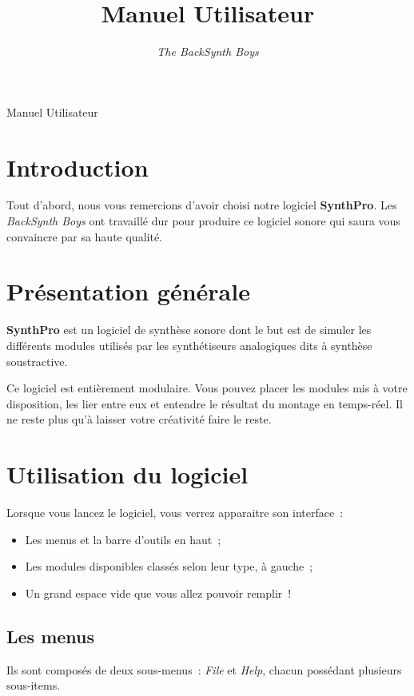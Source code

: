 \documentclass[a4paper,oneside,frenchb,10pt]{article}
\title{Manuel Utilisateur}
\author{\emph{The BackSynth Boys}}
\begin{document}
\thispagestyle{empty}

\begin{center}
\huge Manuel Utilisateur
\end{center}

\vspace{1cm}

\tableofcontents

\section{Introduction}

Tout d'abord, nous vous remercions d'avoir choisi notre logiciel
\textbf{SynthPro}. Les \emph{BackSynth Boys} ont travaillé dur pour produire ce logiciel
sonore qui saura vous convaincre par sa haute qualité.

\section{Présentation générale}

\textbf{SynthPro} est un logiciel de synthèse sonore dont le but est de 
simuler les différents modules utilisés par les synthétiseurs analogiques
dits à synthèse soustractive.

Ce logiciel est entièrement modulaire. Vous pouvez placer les modules
mis à votre disposition, les lier entre eux et entendre le résultat du
montage en temps-réel. Il ne reste plus qu'à laisser votre créativité
faire le reste.

\section{Utilisation du logiciel}

Lorsque vous lancez le logiciel, vous verrez apparaitre son interface~:

\begin{itemize}
\item
  Les menus et la barre d'outils en haut~;
\item
  Les modules disponibles classés selon leur type, à gauche~;
\item
  Un grand espace vide que vous allez pouvoir remplir~!
\end{itemize}
\subsection{Les menus}

Ils sont composés de deux sous-menus~: \emph{File} et \emph{Help}, chacun 
possédant plusieurs sous-items.
\end{document}
